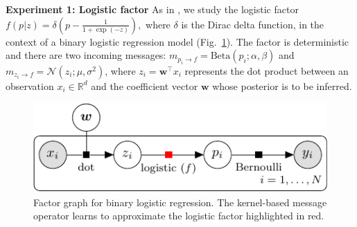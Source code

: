 \documentclass[english]{article}
\theoremstyle{plain}
\theoremstyle{plain}
\newcommand{\factor}{f}				%
\newcommand{\msg}[2]{m_{#1 \rightarrow #2}}			%
\newcommand{\figref}[1]{Fig.~\ref{#1}}
\begin{document}



\textbf{Experiment 1: Logistic factor}
As in \citet{Heess2013,Eslami2014}, we study the logistic factor 
$\factor(p|z)=\delta\left(p-\frac{1}{1+\exp(-z)}\right),$ 
%
%
where $\delta$ is the Dirac delta function, in the context of 
a binary logistic regression model  (\figref{fig:factor_graph_binlog}).
The factor is deterministic and there are two incoming messages: 
$\msg{p_i}{\factor} = \text{Beta}(p_i; \alpha, \beta) $ and 
$\msg{z_i}{\factor} = \mathcal{N}(z_i; \mu, \sigma^2)$, 
where $z_i = \boldsymbol{w}^\top x_i$ represents the dot product between an observation 
$x_i \in \mathbb{R}^d$ and the coefficient vector $\boldsymbol{w}$ whose posterior is 
to be inferred.


\begin{figure}[ht]
\centering
\includegraphics[width=0.8\columnwidth]{binary_logistic_regression-crop}
%  
%  
\caption{Factor graph for binary logistic regression. 
The kernel-based message operator learns to approximate the logistic factor 
highlighted in red. 
}
\label{fig:factor_graph_binlog}
\end{figure}
\end{document}
